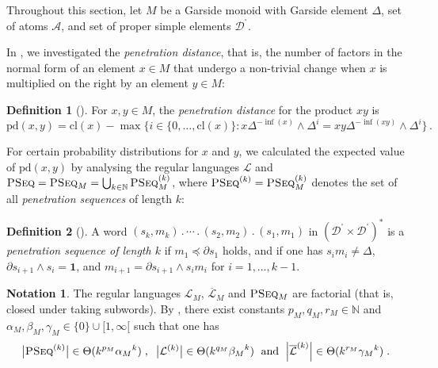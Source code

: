 \documentclass[a4paper,final]{article}
\theoremstyle{plain}
\theoremstyle{remark}
\theoremstyle{definition}
\newtheorem{definition}[definition]{Definition}
\newtheorem{notation}[notation]{Notation}
\begin{document}
Throughout this section, let $M$ be a Garside monoid with Garside element $\Delta$, set of atoms ${\mathcal{A}}$, and set of proper simple elements ${{\mathcal{D}}^{\!{}^{\circ}\!}}$.

In \cite{GT13}, we investigated the \emph{penetration distance}, that is, the number of factors in the normal form of an element $x\in M$ that undergo a non-trivial change when $x$ is multiplied on the right by an element $y\in M$:

\begin{definition}[{\cite[Definition 3.2]{GT13}}]
  For $x,y\in M$, the \emph{penetration distance} for the product
  $xy$ is
  \[
  {\mathrm{pd}}(x,y) = {\mathrm{cl}}(x) - \max\big\{ i \in \{0,\ldots,{\mathrm{cl}}(x)\} :
        x\Delta^{-\inf(x)}  \wedge \Delta^i
        = xy\Delta^{-\inf(xy)} \wedge \Delta^i \big\} \,.
  \]
\end{definition}

For certain probability distributions for $x$ and $y$, we calculated the expected value of ${\mathrm{pd}}(x,y)$ by analysing the regular languages ${\mathcal{L}}$ and ${\textsc{PSeq}} = {\textsc{PSeq}}_M = \bigcup_{k\in{\mathbb{N}}} {\textsc{PSeq}}_M^{(k)}$, where
${\textsc{PSeq}}^{(k)}={\textsc{PSeq}}_M^{(k)}$ denotes the set of all \emph{penetration sequences} of length $k$:

\begin{definition}[{\cite[Definition 4.2]{GT13}}]
  A word $(s_k, m_k) {\mathbin{.}}\cdots {\mathbin{.}}(s_2, m_2) {\mathbin{.}}(s_1, m_1)$ in
  $\left({{\mathcal{D}}^{\!{}^{\circ}\!}} \times {{\mathcal{D}}^{\!{}^{\circ}\!}}\right)^*$ is a \emph{penetration
    sequence of length $k$} if $m_1 \preccurlyeq \partial s_1$ holds, and if one has
  $s_i m_i \ne \Delta$, $\partial s_{i+1} \wedge s_i = {\mathbf{1}}$, and
  $m_{i+1} = \partial s_{i+1} \wedge s_{i} m_{i}$ for $i=1,\ldots,k-1$.
\end{definition}

\begin{notation}\label{N:GrowthRates}
 The regular languages ${\mathcal{L}}_M$, ${\overline{\mathcal{L}}}_M$ and ${\textsc{PSeq}}_M$ are factorial (that is, closed under taking subwords).  By \cite[Corollary 4]{Shur08}, there exist constants $p_M,q_M,r_M\in{\mathbb{N}}$ and $\alpha_M,\beta_M,\gamma_M\in \{0\}\cup [1,\infty[$ such that one has
 \[
   \big|{\textsc{PSeq}}^{(k)}\big|\in\Theta(k^{p_M}{\alpha_M}^k) \;,\;\;
   \big|{\mathcal{L}}^{(k)}\big|\in\Theta(k^{q_M}{\beta_M}^k)\; \text{ and }\;
   \Big|{\overline{\mathcal{L}}}^{(k)}\Big|\in\Theta(k^{r_M}{\gamma_M}^k) \;.
 \]
\end{notation}
\end{document}
